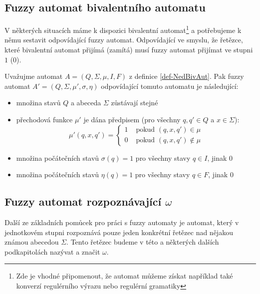\documentclass[a4paper,10pt]{article}
\begin{document}
\subsection{Fuzzy automat bivalentního automatu}
V některých situacích máme k dispozici  bivalentní automat\footnote{Zde je vhodné připomenout, že automat můžeme získat například také konverzí regulérního výrazu nebo regulérní gramatiky} a potřebujeme k němu sestavit odpovídající fuzzy automat. Odpovídající ve smyslu, že řetězce, které bivalentní automat přijímá (zamítá) musí fuzzy automat přijímat ve stupni $1$ ($0$).

Uvažujme automat $A = (Q, \Sigma, \mu, I, F)$ z definice \ref{def-NedBivAut}. Pak fuzzy automat $A' = (Q, \Sigma, \mu', \sigma, \eta)$ odpovídající tomuto automatu je následující:
\begin{itemize}
 \item množina stavů $Q$ a abeceda $\Sigma$ zůstávají stejné
 \item přechodová funkce $\mu'$ je dána předpisem (pro všechny $q, q' \in Q$ a $x \in \Sigma$):
 $$
  \mu'(q, x, q') = 
    \begin{cases}
     1 & \text{ pokud $(q, x, q') \in \mu$} \\
     0 & \text{ pokud $(q, x, q') \notin \mu$}
    \end{cases}
 $$
 \item množina počátečních stavů $\sigma(q) = 1$ pro všechny stavy $q \in I$, jinak $0$
 \item množina počátečních stavů $\eta(q) = 1$ pro všechny stavy $q \in F$, jinak $0$
\end{itemize}



\subsection{Fuzzy automat rozpoznávající $\omega$} \label{sec:FuzAutRozpOme}
Další ze základních pomůcek pro práci s fuzzy automaty je automat, který v jednotkovém stupni rozpoznává pouze jeden konkrétní řetězec nad nějakou známou abecedou $\Sigma$. Tento řetězec budeme v této a některých dalších podkapitolách nazývat  a značit $\omega$.
\end{document}
